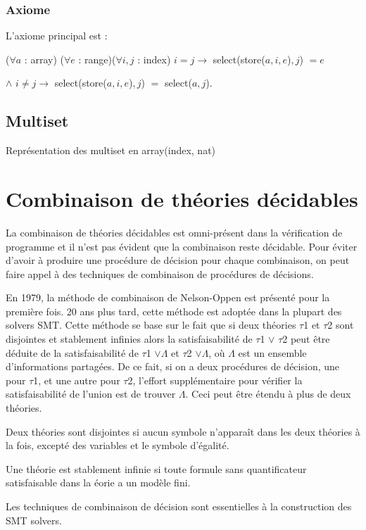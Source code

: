 \documentclass[9pt]{book}
\begin{document}
			\subsubsection{Axiome}
			L'axiome principal est : \par
 			($\forall a$ : array) ($\forall e$ : range)($\forall i,j$ : index) $i=j \rightarrow$ select(store($a,i,e$)$,j$) $ = e$  
			\par $\land$ $i\neq j \rightarrow$ select(store($a,i,e$)$,j$) $=$ select($a,j$).
 		\subsection{Multiset}
 		Repr\'esentation des multiset en array(index, nat)
 		
 	\section{Combinaison de th\'eories d\'ecidables}
 		La combinaison de th\'eories d\'ecidables est omni-pr\'esent dans la v\'erification de programme et il n'est pas \'evident que la combinaison reste d\'ecidable. Pour \'eviter d'avoir \`a produire une proc\'edure de d\'ecision pour chaque combinaison, on peut faire appel \`a des techniques de combinaison de proc\'edures de d\'ecisions.
 		
 		En 1979, la m\'ethode de combinaison de Nelson-Oppen est pr\'esent\'e pour la premi\`ere fois. 20 ans plus tard, cette m\'ethode est adopt\'ee dans la plupart des solvers SMT. Cette m\'ethode se base sur le fait que si deux th\'eories $\tau$1 et $\tau$2 sont disjointes et stablement infinies alors la satisfaisabilit\'e de $\tau$1 $\lor$ $\tau$2 peut \^etre d\'eduite de la satisfaisabilit\'e de $\tau$1 $\lor \Lambda$ et $\tau$2 $\lor \Lambda$, o\`u $\Lambda$ est un ensemble d'informations partag\'ees. De ce fait, si on a deux proc\'edures de d\'ecision, une pour $\tau$1, et une autre pour $\tau$2, l'effort suppl\'ementaire pour v\'erifier la satisfaisabilit\'e de l'union est de trouver $\Lambda$. Ceci peut \^etre \'etendu \`a plus de deux th\'eories. \par
 		Deux th\'eories sont disjointes si aucun symbole n'appara\^it dans les deux th\'eories \`a la fois, except\'e des variables et le symbole d'\'egalit\'e. \par
 		Une th\'eorie est stablement infinie si toute formule sans quantificateur satisfaisable dans la \th\'eorie a un mod\`ele fini.
 		
 		\par Les techniques de combinaison de d\'ecision sont essentielles \`a la construction des SMT solvers.
 		
\end{document}
